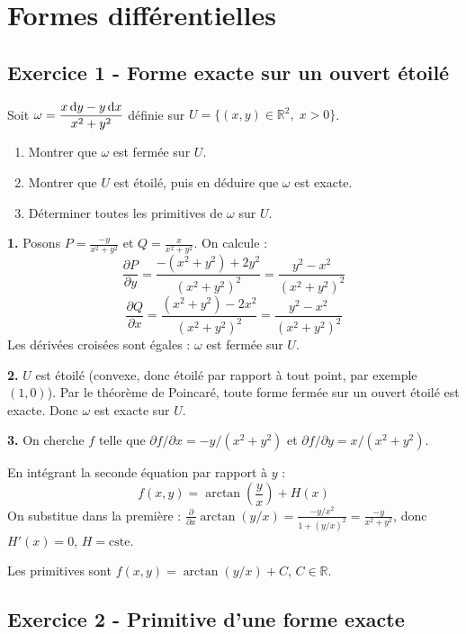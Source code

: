 \documentclass[12pt,a4paper]{article}
\begin{document}
\newpage
\section{Formes différentielles}

\subsection*{Exercice 1 - Forme exacte sur un ouvert étoilé \niveau{\facile}}

\begin{boiteexercice}
Soit $\omega = \dfrac{x\,\mathrm{d} y - y\,\mathrm{d} x}{x^2+y^2}$ définie sur $U=\{(x,y)\in\mathbb{R}^2,\;x>0\}$.
\begin{enumerate}
  \item Montrer que $\omega$ est fermée sur $U$.
  \item Montrer que $U$ est étoilé, puis en déduire que $\omega$ est exacte.
  \item Déterminer toutes les primitives de $\omega$ sur $U$.
\end{enumerate}
\end{boiteexercice}

\begin{boitecorrige}
\textbf{1.} Posons $P = \frac{-y}{x^2+y^2}$ et $Q = \frac{x}{x^2+y^2}$. On calcule :
\[
\frac{\partial P}{\partial y} = \frac{-(x^2+y^2)+2y^2}{(x^2+y^2)^2} = \frac{y^2-x^2}{(x^2+y^2)^2}
\]
\[
\frac{\partial Q}{\partial x} = \frac{(x^2+y^2)-2x^2}{(x^2+y^2)^2} = \frac{y^2-x^2}{(x^2+y^2)^2}
\]
Les dérivées croisées sont égales : $\omega$ est fermée sur $U$.

\textbf{2.} $U$ est étoilé (convexe, donc étoilé par rapport à tout point, par exemple $(1,0)$). Par le théorème de Poincaré, toute forme fermée sur un ouvert étoilé est exacte. Donc $\omega$ est exacte sur $U$.

\textbf{3.} On cherche $f$ telle que $\partial f/\partial x = -y/(x^2+y^2)$ et $\partial f/\partial y = x/(x^2+y^2)$.

En intégrant la seconde équation par rapport à $y$ :
\[
f(x,y) = \arctan\!\left(\frac{y}{x}\right) + H(x)
\]
On substitue dans la première : $\frac{\partial}{\partial x}\arctan(y/x) = \frac{-y/x^2}{1+(y/x)^2} = \frac{-y}{x^2+y^2}$, donc $H'(x)=0$, $H=\text{cste}$.

Les primitives sont $f(x,y) = \arctan(y/x) + C$, $C\in\mathbb{R}$.
\end{boitecorrige}

\subsection*{Exercice 2 - Primitive d'une forme exacte \niveau{\moyen}}
\end{document}
